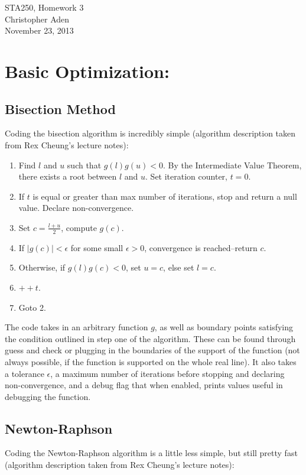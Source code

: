 \documentclass[12pt]{article}
\begin{document}
\begin{center}
STA250, Homework 3 \\
Christopher Aden\\
November 23, 2013\
\end{center}

\section{Basic Optimization:}
\subsection*{Bisection Method}
Coding the bisection algorithm is incredibly simple (algorithm description taken from Rex Cheung's lecture notes):

\begin{enumerate}
\item Find $l$ and $u$ such that $g(l)g(u) < 0$. By the Intermediate Value Theorem, there exists a root between $l$ and $u$. Set iteration counter, $t=0$.
\item If $t$ is equal or greater than max number of iterations, stop and return a null value. Declare non-convergence.
\item Set $c = \frac{l+u}{2}$, compute $g(c)$.
\item If $|g(c)| < \epsilon$ for some small $\epsilon>0$, convergence is reached--return $c$.
\item Otherwise, if $g(l)g(c) < 0$, set $u = c$, else set $l = c$. 
\item $++t$.
\item Goto 2.
\end{enumerate}
The code takes in an arbitrary function $g$, as well as boundary points satisfying the condition outlined in step one of the algorithm. These can be found through guess and check or plugging in the boundaries of the support of the function (not always possible, if the function is supported on the whole real line). It also takes a tolerance $\epsilon$, a maximum number of iterations before stopping and declaring non-convergence, and a debug flag that when enabled, prints values useful in debugging the function.

\subsection*{Newton-Raphson}
Coding the Newton-Raphson algorithm is a little less simple, but still pretty fast (algorithm description taken from Rex Cheung's lecture notes):
\end{document}
